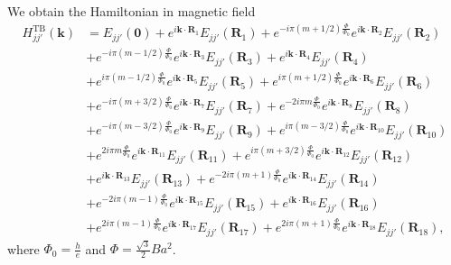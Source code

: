 \documentclass{article}
\begin{document}
We obtain the Hamiltonian in magnetic field
\begin{equation}
	\begin{aligned}
		H_{jj'}^{\text{TB}}(\mathbf{k})
		& = E_{jj'}(\mathbf{0}) + e^{i \mathbf{k} \cdot \mathbf{R}_{1}} E_{jj'}(\mathbf{R}_{1}) 
		+ e^{-i\pi(m + 1/2)\tfrac{\Phi}{\Phi_{0}}} e^{i \mathbf{k} \cdot \mathbf{R}_{2}} E_{jj'}(\mathbf{R}_{2})  \\
		& + e^{-i\pi(m - 1/2)\tfrac{\Phi}{\Phi_{0}}} e^{i \mathbf{k} \cdot \mathbf{R}_{3}} E_{jj'}(\mathbf{R}_{3}) 
		+ e^{i \mathbf{k} \cdot \mathbf{R}_{4}} E_{jj'}(\mathbf{R}_{4})                                  \\
		& + e^{i\pi(m - 1/2)\tfrac{\Phi}{\Phi_{0}}} e^{i \mathbf{k} \cdot \mathbf{R}_{5}} E_{jj'}(\mathbf{R}_{5}) 
		+ e^{i\pi(m + 1/2)\tfrac{\Phi}{\Phi_{0}}} e^{i \mathbf{k} \cdot \mathbf{R}_{6}} E_{jj'}(\mathbf{R}_{6}) \\
		& + e^{- i\pi(m + 3/2)\tfrac{\Phi}{\Phi_{0}} } e^{i \mathbf{k} \cdot \mathbf{R}_{7}} E_{jj'}(\mathbf{R}_{7}) 
		+ e^{- 2i\pi m\tfrac{\Phi}{\Phi_{0}} } e^{i \mathbf{k} \cdot \mathbf{R}_{8}} E_{jj'}(\mathbf{R}_{8}) \\
		& + e^{- i\pi(m - 3/2)\tfrac{\Phi}{\Phi_{0}} } e^{i \mathbf{k} \cdot \mathbf{R}_{9}} E_{jj'}(\mathbf{R}_{9}) 
		+ e^{ i\pi (m-3/2)\tfrac{\Phi}{\Phi_{0}} } e^{i \mathbf{k} \cdot \mathbf{R}_{10}} E_{jj'}(\mathbf{R}_{10}) \\
		& + e^{2 i\pi m \tfrac{\Phi}{\Phi_{0}} } e^{i \mathbf{k} \cdot \mathbf{R}_{11}} E_{jj'}(\mathbf{R}_{11}) 
		+ e^{ i\pi (m+3/2)\tfrac{\Phi}{\Phi_{0}} } e^{i \mathbf{k} \cdot \mathbf{R}_{12}} E_{jj'}(\mathbf{R}_{12}) \\
		& + e^{i \mathbf{k} \cdot \mathbf{R}_{13}} E_{jj'}(\mathbf{R}_{13}) 
		+ e^{-2i\pi(m + 1)\tfrac{\Phi}{\Phi_{0}}} e^{i \mathbf{k} \cdot \mathbf{R}_{14}} E_{jj'}(\mathbf{R}_{14})  \\
		& + e^{-2i\pi(m - 1)\tfrac{\Phi}{\Phi_{0}}} e^{i \mathbf{k} \cdot \mathbf{R}_{15}} E_{jj'}(\mathbf{R}_{15}) 
		+ e^{i \mathbf{k} \cdot \mathbf{R}_{16}} E_{jj'}(\mathbf{R}_{16})                                  \\
		& + e^{2i\pi(m - 1)\tfrac{\Phi}{\Phi_{0}}} e^{i \mathbf{k} \cdot \mathbf{R}_{17}} E_{jj'}(\mathbf{R}_{17}) 
		+ e^{2i\pi(m + 1)\tfrac{\Phi}{\Phi_{0}}} e^{i \mathbf{k} \cdot \mathbf{R}_{18}} E_{jj'}(\mathbf{R}_{18}),
	\end{aligned}
\end{equation}
where $\Phi_{0} = \frac{h}{e}$ and $\Phi = \frac{\sqrt{3}}{2} Ba^{2}$.
\end{document}
